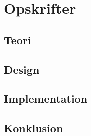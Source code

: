\section{Opskrifter}
\subsection{Teori}

\subsection{Design}
\subsection{Implementation}
\subsection{Konklusion}
